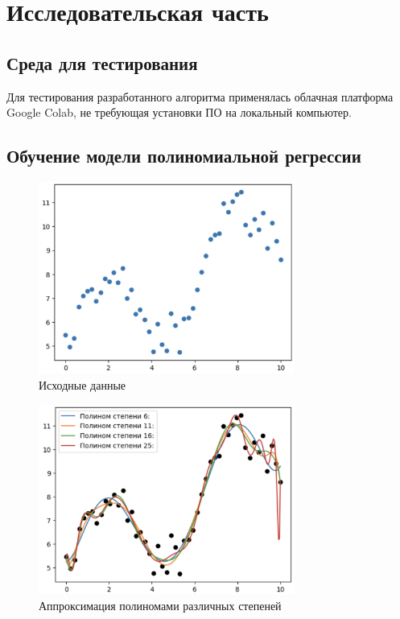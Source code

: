 \chapter{Исследовательская часть}

\section{Среда для тестирования}

Для тестирования разработанного алгоритма применялась облачная платформа Google Colab, не требующая установки ПО на локальный компьютер.

% 

\section{Обучение модели полиномиальной регрессии}

\begin{figure}
	\begin{center}
		\includegraphics[width=0.75\textwidth]{images/1.png}
	\end{center}
	\caption{Исходные данные}
	\label{img:1}
\end{figure}

\begin{figure}
	\begin{center}
		\includegraphics[width=0.75\textwidth]{images/2.png}
	\end{center}
	\caption{Аппроксимация полиномами различных степеней}
	\label{img:2}
\end{figure}

